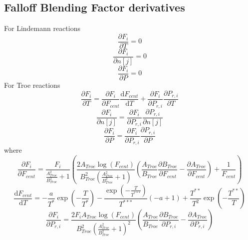 \documentclass[a4paper,10pt]{article}
\begin{document}
\subsection{Falloff Blending Factor derivatives}

 For Lindemann reactions
\begin{dmath} \frac{\partial F_{i} }{\partial T } = 0\end{dmath} 
\begin{dmath} \frac{\partial F_{i} }{\partial n[j] } = 0\end{dmath} 
\begin{dmath} \frac{\partial F_{i} }{\partial P } = 0\end{dmath} 
For Troe reactions
\begin{dmath} \frac{\partial F_{i} }{\partial T } = \frac{\partial F_{i} }{\partial F_{cent} } \frac{\text{d} F_{cent} }{\text{d} T } + \frac{\partial F_{i} }{\partial P_{r, i} } \frac{\partial P_{r, i} }{\partial T }\end{dmath} 
\begin{dmath} \frac{\partial F_{i} }{\partial n[j] } = \frac{\partial F_{i} }{\partial P_{r, i} } \frac{\partial P_{r, i} }{\partial n[j] }\end{dmath} 
\begin{dmath} \frac{\partial F_{i} }{\partial P } = \frac{\partial F_{i} }{\partial P_{r, i} } \frac{\partial P_{r, i} }{\partial P }\end{dmath} 
where
\begin{dmath} \frac{\partial F_{i} }{\partial F_{cent} } = \frac{F_{i}}{\frac{A_{Troe}^{2}}{B_{Troe}^{2}} + 1} \left(\frac{2 A_{Troe} \log{\left (F_{cent} \right )}}{B_{Troe}^{2} \left(\frac{A_{Troe}^{2}}{B_{Troe}^{2}} + 1\right)} \left(\frac{A_{Troe}}{B_{Troe}} \frac{\partial B_{Troe} }{\partial F_{cent} } - \frac{\partial A_{Troe} }{\partial F_{cent} }\right) + \frac{1}{F_{cent}}\right)\end{dmath} 
\begin{dmath} \frac{\text{d} F_{cent} }{\text{d} T } = - \frac{a}{T^{*}} \operatorname{exp}\left({- \frac{T}{T^{*}}}\right) - \frac{\operatorname{exp}\left({- \frac{T}{T^{***}}}\right)}{T^{***}} \left(- a + 1\right) + \frac{T^{**}}{T^{2}} \operatorname{exp}\left({- \frac{T^{**}}{T}}\right)\end{dmath} 
\begin{dmath} \frac{\partial F_{i} }{\partial P_{r, i} } = \frac{2 F_{i} A_{Troe} \log{\left (F_{cent} \right )}}{B_{Troe}^{2} \left(\frac{A_{Troe}^{2}}{B_{Troe}^{2}} + 1\right)^{2}} \left(\frac{A_{Troe}}{B_{Troe}} \frac{\partial B_{Troe} }{\partial P_{r, i} } - \frac{\partial A_{Troe} }{\partial P_{r, i} }\right)\end{dmath} 
\end{document}
